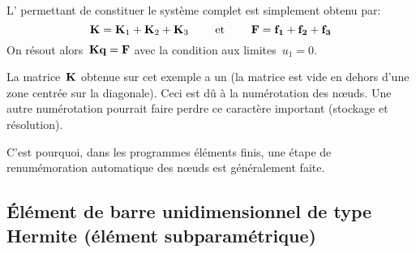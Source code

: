 \medskipvm
L' permettant de constituer le système complet est simplement obtenu par:
\begin{equation} \MM{K}=\MM{K}_1+\MM{K}_2+\MM{K}_3 \qquad \text{ et } \qquad \VV{F}=\VV{f_1}+\VV{f_2}+\VV{f_3} \end{equation}
\medskipvm
On résout alors~$\MM{K}\VV{q}=\VV{F}$ avec la condition aux limites~$u_1=0$.

\medskip
\begin{remarque}
La matrice~$\MM{K}$ obtenue sur cet exemple a un  (la matrice est vide en dehors d'une zone centrée sur la diagonale). Ceci est dû à la numérotation des nœuds. Une autre numérotation pourrait faire perdre ce caractère important (stockage et résolution).

C'est pourquoi, dans les programmes éléments finis, une étape de renumémoration automatique des nœuds est généralement faite.
\end{remarque}

\medskip
\subsection{Élément de barre unidimensionnel de type Hermite (élément subparamétrique)}

